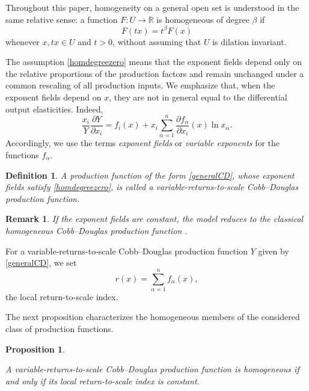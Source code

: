 \documentclass[12pt]{amsart}
\newtheorem{proposition}{Proposition}[section]
\newtheorem{definition}{Definition}[section]
\newtheorem{remark}{Remark}[section]
\begin{document}
Throughout this paper, homogeneity on a general open set is understood in the same relative sense: a function $F:U\to\mathbb R$ is homogeneous of degree $\beta$ if
\[
F(tx)=t^\beta F(x)
\]
whenever $x,tx\in U$ and $t>0$, without assuming that \(U\) is dilation invariant.

The assumption \eqref{homdegreezero} means that the exponent fields depend only on the
relative proportions of the production factors and remain unchanged
under a common rescaling of all production inputs. We emphasize that, when the exponent fields depend on $x$, they are not in general equal to the differential output elasticities. Indeed,
\[
\frac{x_i}{Y}\frac{\partial Y}{\partial x_i}
=f_i(x)+x_i\sum_{\alpha=1}^n\frac{\partial f_\alpha}{\partial x_i}(x)\ln x_\alpha.
\]
Accordingly, we use the terms \emph{exponent fields} or \emph{variable exponents} for the functions $f_\alpha$.

\begin{definition}\cite{Janvry}
A production function of the form
\eqref{generalCD},
whose exponent fields satisfy
\eqref{homdegreezero},
is called a
\emph{variable-returns-to-scale Cobb--Douglas production function}.

\end{definition}

\begin{remark}

If the exponent fields are constant,
the model reduces to the classical homogeneous Cobb--Douglas production
function \cite{CD}.

\end{remark}

For a variable-returns-to-scale Cobb--Douglas production function \(Y\) given by \eqref{generalCD}, we set
\begin{equation}\label{r-t-s-index}
r(x)
=
\sum_{\alpha=1}^{n}
f_{\alpha}(x),
\end{equation}
the local return-to-scale index.


The next proposition characterizes the homogeneous members of the
considered class of production functions.

\begin{proposition}\label{prop:homogeneous-characterization}

A variable-returns-to-scale Cobb--Douglas production function is
homogeneous if and only if its local return-to-scale index is constant.

\end{proposition}
\end{document}
